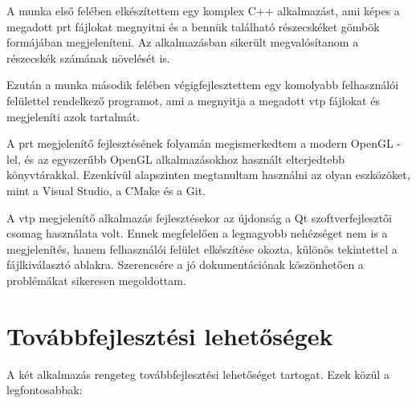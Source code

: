 A munka első felében elkészítettem egy komplex C++ alkalmazást,
ami képes a megadott prt fájlokat megnyitni
és a bennük található részecskéket 
gömbök formájában megjeleníteni.
Az alkalmazásban sikerült megvalósítanom 
a részecskék számának növelését is.

Ezután a munka második felében végigfejlesztettem egy komolyabb 
felhasználói felülettel rendelkező programot,
ami a megnyitja a megadott vtp fájlokat
és megjeleníti azok tartalmát.

A prt megjelenítő fejlesztésének folyamán 
megismerkedtem a modern OpenGL -lel,
és az egyszerűbb OpenGL alkalmazásokhoz 
használt elterjedtebb könyvtárakkal.
Ezenkívül alapszinten megtanultam használni 
az olyan eszközöket, mint a Visual Studio,
a CMake és a Git. 

A vtp megjelenítő alkalmazás fejlesztésekor az újdonság 
a Qt szoftverfejlesztői csomag használata volt.
Ennek megfelelően a legnagyobb nehézséget 
nem is a megjelenítés,
hanem felhasználói felület elkészítése okozta,
különös tekintettel a fájlkiválasztó ablakra.
Szerencsére a jó dokumentációnak köszönhetően
a problémákat sikeresen megoldottam.

\section{Továbbfejlesztési lehetőségek}

A két alkalmazás rengeteg továbbfejlesztési lehetőséget tartogat.
Ezek közül a legfontosabbak:

